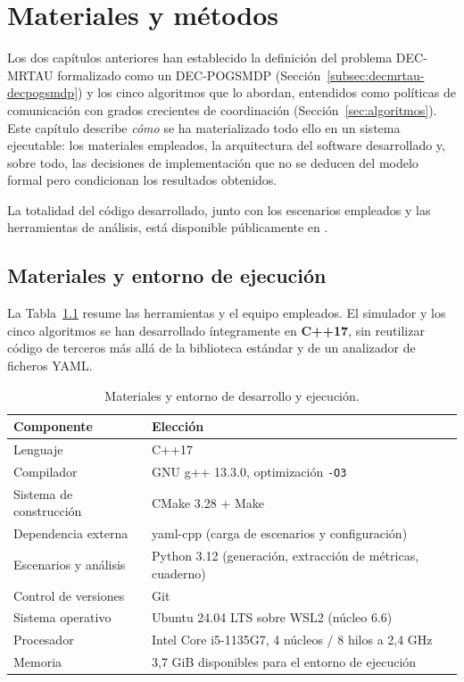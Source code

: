 \chapter{Materiales y métodos}\label{cap:materiales_y_metodos}

Los dos capítulos anteriores han establecido la definición del problema DEC-MRTAU formalizado como un DEC-POGSMDP (Sección~\ref{subsec:decmrtau-decpogsmdp}) y los cinco algoritmos que lo abordan, entendidos como políticas de comunicación con grados crecientes de coordinación (Sección~\ref{sec:algoritmos}). Este capítulo describe \emph{cómo} se ha materializado todo ello en un sistema ejecutable: los materiales empleados, la arquitectura del software desarrollado y, sobre todo, las decisiones de implementación que no se deducen del modelo formal pero condicionan los resultados obtenidos.

La totalidad del código desarrollado, junto con los escenarios empleados y las herramientas de análisis, está disponible públicamente en .

\section{Materiales y entorno de ejecución} \label{sec:mat-materiales}

La Tabla~\ref{tab:materiales} resume las herramientas y el equipo empleados. El simulador y los cinco algoritmos se han desarrollado íntegramente en \textbf{C++17}, sin reutilizar código de terceros más allá de la biblioteca estándar y de un analizador de ficheros YAML.

\begin{table}[t]
\centering
\caption{Materiales y entorno de desarrollo y ejecución.}
\label{tab:materiales}
\begin{tabular}{ll}
\hline
\textbf{Componente} & \textbf{Elección} \\
\hline
Lenguaje                     & C++17 \\
Compilador                   & GNU g++ 13.3.0, optimización \texttt{-O3} \\
Sistema de construcción      & CMake 3.28 + Make \\
Dependencia externa          & yaml-cpp (carga de escenarios y configuración) \\
Escenarios y análisis        & Python 3.12 (generación, extracción de métricas, cuaderno) \\
Control de versiones         & Git \\
Sistema operativo            & Ubuntu 24.04 LTS sobre WSL2 (núcleo 6.6) \\
Procesador                   & Intel Core i5-1135G7, 4 núcleos / 8 hilos a 2,4 GHz \\
Memoria                      & 3,7 GiB disponibles para el entorno de ejecución \\
\hline
\end{tabular}
\end{table}

